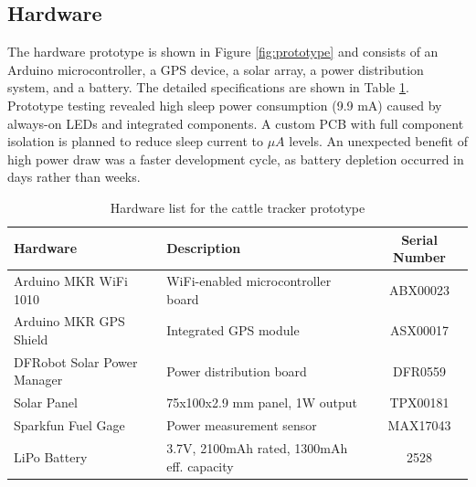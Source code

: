 \documentclass[10pt]{cai}
\begin{document}
\subsection{Hardware}
The hardware prototype is shown in Figure \ref{fig:prototype} and consists of an Arduino microcontroller, a GPS device, a solar array, a power distribution system, and a battery.
The detailed specifications are shown in Table \ref{tab:hardware_inventory}. 
Prototype testing revealed high sleep power consumption (9.9 mA) caused by always-on LEDs and integrated components. 
A custom PCB with full component isolation is planned to reduce sleep current to $\mu A$ levels.
An unexpected benefit of high power draw was a faster development cycle, as battery depletion occurred in days rather than weeks.

\begin{table}[h]
  \centering
  \caption{Hardware list for the cattle tracker prototype}
  \begin{tabular}{l p{6.5cm} c}
      \toprule
      \textbf{Hardware} & \textbf{Description} & \textbf{Serial Number} \\
      \midrule
      Arduino MKR WiFi 1010 & WiFi-enabled microcontroller board & ABX00023 \\
      Arduino MKR GPS Shield & Integrated GPS module & ASX00017 \\
      DFRobot Solar Power Manager & Power distribution board & DFR0559 \\
      Solar Panel & 75x100x2.9 mm panel, 1W output & TPX00181 \\
      Sparkfun Fuel Gage & Power measurement sensor & MAX17043 \\
      LiPo Battery & 3.7V, 2100mAh rated, 1300mAh eff. capacity & 2528 \\
      \bottomrule
  \end{tabular}
  \label{tab:hardware_inventory}
\end{table}
\end{document}
